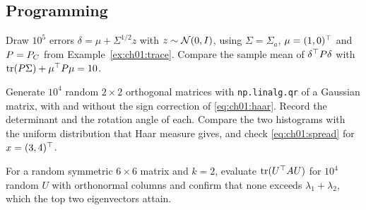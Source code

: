 \subsection*{Programming}

\begin{exercise}\label{exr:ch01:mc}
Draw $10^5$ errors $\delta=\mu+\Sigma^{1/2}z$ with $z\sim\mathcal{N}(0,I)$, using
$\Sigma=\Sigma_a$, $\mu=(1,0)^{\top}$ and $P=P_C$ from Example~\ref{ex:ch01:trace}. Compare the
sample mean of $\delta^{\top} P\delta$ with $\operatorname{tr}(P\Sigma)+\mu^{\top} P\mu=10$.
\end{exercise}

\begin{exercise}\label{exr:ch01:haar}
Generate $10^4$ random $2\times2$ orthogonal matrices with \texttt{np.linalg.qr}
of a Gaussian matrix, with and without the sign correction of \cref{eq:ch01:haar}.
Record the determinant and the rotation angle of each. Compare the two
histograms with the uniform distribution that Haar measure gives, and check
\cref{eq:ch01:spread} for $x=(3,4)^{\top}$.
\end{exercise}

\begin{exercise}\label{exr:ch01:kyfan}
For a random symmetric $6\times6$ matrix and $k=2$, evaluate $\operatorname{tr}(U^{\top} AU)$ for
$10^4$ random $U$ with orthonormal columns and confirm that none exceeds
$\lambda_1+\lambda_2$, which the top two eigenvectors attain.
\end{exercise}

